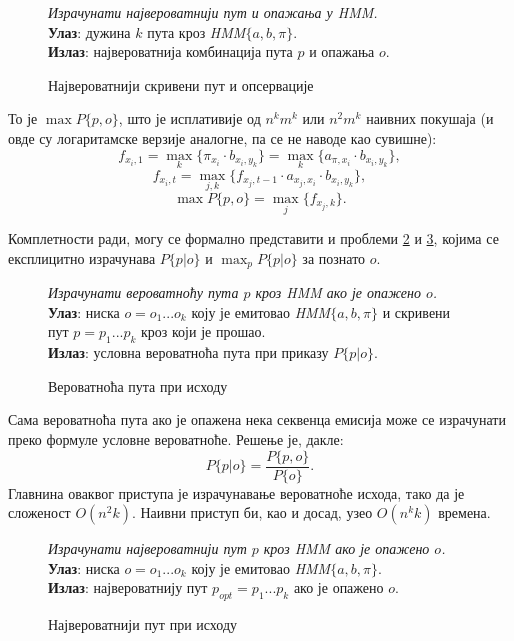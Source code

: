 \documentclass[12pt,oneside]{memoir}
\newenvironment{problem}[1][!ht]
{\renewcommand{\algorithmcfname}{Проблем}
\begin{figure}[!ht]
\centering
  \begin{minipage}{.94\linewidth}
	\begin{algorithm}[#1]%
  }{\end{algorithm}
  \end{minipage}
\end{figure}}
\begin{document}
\begin{CJK}{UTF8}{ipxm}
\begin{problem}[H]
  \SetAlgoLined
  \textit{Израчунати највероватнији пут и опажања у \textit{HMM}.}\\
  \textbf{Улаз}: дужина $k$ пута кроз \textit{HMM}$\{a, b, \pi\}$.\\
  \textbf{Излаз}: највероватнија комбинација пута $p$ и опажања $o$.
  \caption{Највероватнији скривени пут и опсервације}
  \label{prob:maxpo}
\end{problem}

То је $\max P\{p, o\}$, што је исплативије од $n^k m^k$ или $n^2 m^k$ наивних покушаја (и овде су логаритамске верзије аналогне, па се не наводе као сувишне): $$f_{x_i, 1} = \max_k \{\pi_{x_i} \cdot b_{x_i, y_k}\} = \max_k \{a_{\pi, x_i} \cdot b_{x_i, y_k}\},$$ $$f_{x_i, t} = \max_{j, k} \{f_{x_j, t-1} \cdot a_{x_j, x_i} \cdot b_{x_i, y_k}\},$$ $$\max P\{p, o\} = \max_j \{f_{x_j, k}\}.$$

Комплетности ради, могу се формално представити и проблеми \ref{prob:putpri} и \ref{prob:maxputpri}, којима се експлицитно израчунава $P\{p | o\}$ и $\max_p P\{p | o\}$ за познато $o$.

\begin{problem}[H]
  \SetAlgoLined
  \textit{Израчунати вероватноћу пута $p$ кроз \textit{HMM} ако је опажено $o$.}\\
  \textbf{Улаз}: ниска $o = o_1...o_k$ коју је емитовао \textit{HMM}$\{a, b, \pi\}$ и скривени пут $p = p_1...p_k$ кроз који је прошао.\\
  \textbf{Излаз}: условна вероватноћа пута при приказу $P\{p | o\}$.
  \caption{Вероватноћа пута при исходу}
  \label{prob:putpri}
\end{problem}

Сама вероватноћа пута ако је опажена нека секвенца емисија може се израчунати преко формуле условне вероватноће. Решење је, дакле: $$P\{p | o\} = \frac{P\{p, o\}}{P\{o\}}.$$ Главнина оваквог приступа је израчунавање вероватноће исхода, тако да је сложеност $O(n^2 k)$. Наивни приступ би, као и досад, узео $O(n^k k)$ времена.

\begin{problem}[H]
  \SetAlgoLined
  \textit{Израчунати највероватнији пут $p$ кроз \textit{HMM} ако је опажено $o$.}\\
  \textbf{Улаз}: ниска $o = o_1...o_k$ коју је емитовао \textit{HMM}$\{a, b, \pi\}$.\\
  \textbf{Излаз}: највероватнију пут $p_{opt} = p_1...p_k$ ако је опажено $o$.
  \caption{Највероватнији пут при исходу}
  \label{prob:maxputpri}
\end{problem}


\end{CJK}
\end{document}
